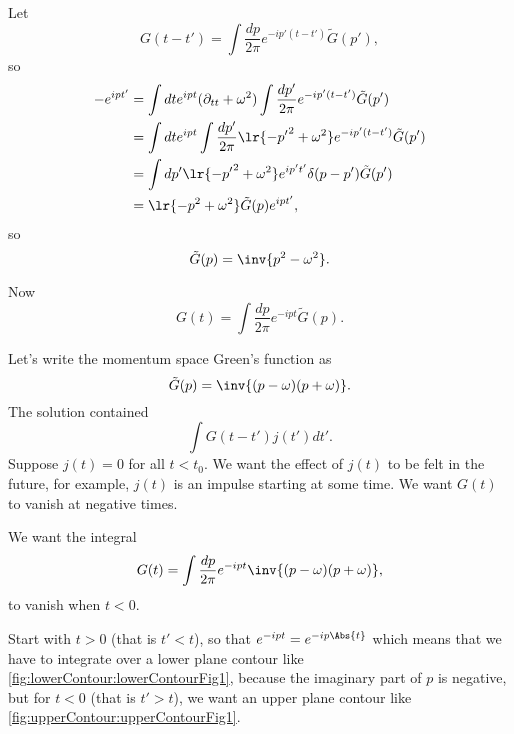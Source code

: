 Let
\begin{equation}\label{eqn:qftLecture11:500}
G(t - t')  = \int \frac{dp }{2 \pi} e^{- i p'(t - t')} \tilde{G}(p'),
\end{equation}
so
\begin{equation}\label{eqn:qftLecture11:520}
\begin{aligned}
- e^{i pt'}
&=
\int dt e^{i p t}
(\partial_{tt} + \omega^2)
\int \frac{dp'}{2 \pi} e^{- i p'(t - t')} \tilde{G}(p') \\
&=
\int dt e^{i p t} \int
\frac{dp'}{2 \pi} \lr{ -{p'}^2 + \omega^2 } e^{- i p'(t - t')} \tilde{G}(p') \\
&=
\int dp' \lr{ -{p'}^2 + \omega^2 } e^{i p' t'} \delta(p - p') \tilde{G}(p') \\
&=
\lr{ -{p}^2 + \omega^2 } \tilde{G}(p) e^{i p t'},
\end{aligned}
\end{equation}
so
\begin{equation}\label{eqn:qftLecture11:540}
\tilde{G}(p) = \inv{p^2 - \omega^2}.
\end{equation}

Now
\begin{equation}\label{eqn:qftLecture11:560}
G(t) = \int \frac{dp}{2 \pi} e^{-i p t}
\tilde{G}(p).
\end{equation}

Let's write the momentum space Green's function as
\begin{equation}\label{eqn:qftLecture11:580}
\tilde{G}(p) = \inv{(p - \omega)(p + \omega)}.
\end{equation}
The solution contained
\begin{equation}\label{eqn:qftLecture11:600}
\int G(t - t') j(t') dt'.
\end{equation}
Suppose \( j(t) = 0 \) for all \( t < t_0 \).  We want the effect of \( j(t) \) to be felt in the future, for example, \(j(t) \) is an impulse starting at some time.  We want \( G(t) \) to vanish at negative times.

We want the integral
\begin{equation}\label{eqn:qftLecture11:620}
G(t) = \int \frac{dp}{2 \pi} e^{-i p t}
\inv{(p - \omega)(p + \omega)},
\end{equation}
to vanish when \( t < 0 \).

Start with \( t > 0 \) (that is \( t' < t \)), so that \( e^{-i p t} = e^{-i p \Abs{t}} \) which means that we have to integrate over a lower plane contour like \cref{fig:lowerContour:lowerContourFig1}, because the imaginary part of \( p \) is negative, but for \( t < 0 \) (that is \( t' > t \)), we want an upper plane contour like \cref{fig:upperContour:upperContourFig1}.


